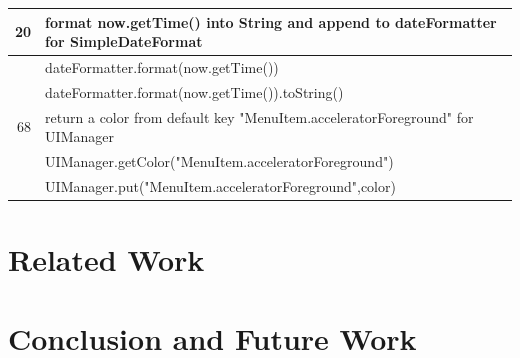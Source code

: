 \documentclass[sigconf,review,anonymous]{article}
\begin{document}
\begin{table}[]
\begin{tabular}{|l|l|}
\multicolumn{1}{|r|}{20}          & format now.getTime() into String and append to dateFormatter for SimpleDateFormat           \\ \hline
\rowcolor[HTML]{FFCCC9} 
                                  & dateFormatter.format(now.getTime())                                                         \\ \hline
\rowcolor[HTML]{FFCCC9} 
                                  & dateFormatter.format(now.getTime()).toString()                                              \\ \hline
\multicolumn{1}{|r|}{68}          & return a color from default key "MenuItem.acceleratorForeground" for UIManager              \\ \hline
\rowcolor[HTML]{FFCCC9} 
                                  & UIManager.getColor("MenuItem.acceleratorForeground")                                        \\ \hline
\rowcolor[HTML]{FFCCC9} 
                                  & UIManager.put("MenuItem.acceleratorForeground",color)                                       \\ \hline
\end{tabular}
\end{table}

\section{Related Work}
\section{Conclusion and Future Work}

\clearpage
{}

\end{document}
